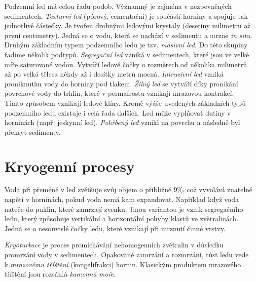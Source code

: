 Podzemní led má celou řadu podob. Významný je zejména v nezpevněných sedimentech.  \emph{Texturní led} (pórový, cementační) je součástí horniny a spojuje tak jednotlivé částečky. Je tvořen drobnými ledovými krystaly (desetiny milimetru až první centimetry). Jedná se o vodu, která se nachází v sedimentu a mrzne \textit{in situ}. Druhým základním typem podzemního ledu je tzv. \emph{masivní led}. Do této skupiny řadíme několik podtypů. \emph{Segregační led} vzniká v sedimentech, které jsou ve velké míře saturované vodou. Vytváří ledové čočky o rozměrech od několika milimetrů až po velká tělesa někdy až i desítky metrů mocná. \emph{Intruzivní led} vzniká proniknutím vody do horniny pod tlakem. \emph{Žilný led} se vytváří díky pronikání povrchové vody do trhlin, které v permafrostu vznikají mrazovou kontrakcí. Tímto způsobem vznikají ledové klíny. Kromě výáše uvedených základních typů podzemního ledu existuje i celá řada dalších. Led může vyplňovat dutiny v horninách (např. jeskynní led). \emph{Pohřbený led} vznikl na povrchu a následně byl překryt sedimenty.

\section{Kryogenní procesy}
Voda při přeměně v led zvětšuje svůj objem o přibližně $9 \%$, což vyvolává znatelné napětí v horninách, pokud voda nemá kam expandovat. Například když voda nateče do puklin, které zamrzají zvenku. Jinou variantou je vznik segregačního ledu, který způsobuje vertikální a horizontální pohyby klastů ve zvětralinách. Jedná se o nesouvislé čočky ledu, které vznikají při mrznutí činné vrstvy. 

\emph{Kryoturbace} je proces promíchávání nehomogenních zvětralin v důsledku promrzání vody v sedimentech. 
Opakované zamrzání a rozmrzání, růst ledu vede k \emph{mrazovému tříštění} (kongelifrakci) hornin. Klasickým produktem mrazového tříštění jsou rozsáhlá \emph{kamenná moře}. 

